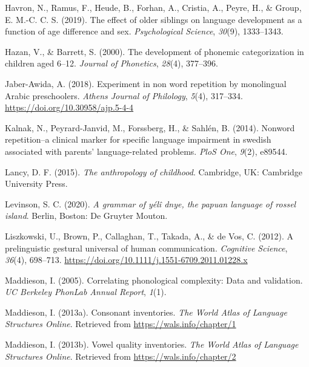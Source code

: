 \documentclass[english,,man,floatsintext]{apa6}
\begin{document}
\leavevmode\hypertarget{ref-havron2019effect}{}%
Havron, N., Ramus, F., Heude, B., Forhan, A., Cristia, A., Peyre, H., \& Group, E. M.-C. C. S. (2019). The effect of older siblings on language development as a function of age difference and sex. \emph{Psychological Science}, \emph{30}(9), 1333--1343.

\leavevmode\hypertarget{ref-hazan2000development}{}%
Hazan, V., \& Barrett, S. (2000). The development of phonemic categorization in children aged 6--12. \emph{Journal of Phonetics}, \emph{28}(4), 377--396.

\leavevmode\hypertarget{ref-jabere2018xperiment}{}%
Jaber-Awida, A. (2018). Experiment in non word repetition by monolingual Arabic preschoolers. \emph{Athens Journal of Philology}, \emph{5}(4), 317--334. \url{https://doi.org/10.30958/ajp.5-4-4}

\leavevmode\hypertarget{ref-kalnak2014nonword}{}%
Kalnak, N., Peyrard-Janvid, M., Forssberg, H., \& Sahlén, B. (2014). Nonword repetition--a clinical marker for specific language impairment in swedish associated with parents' language-related problems. \emph{PloS One}, \emph{9}(2), e89544.

\leavevmode\hypertarget{ref-lancy2015anthropology}{}%
Lancy, D. F. (2015). \emph{The anthropology of childhood}. Cambridge, UK: Cambridge University Press.

\leavevmode\hypertarget{ref-levinsonYDgrammar}{}%
Levinson, S. C. (2020). \emph{A grammar of yélî dnye, the papuan language of rossel island}. Berlin, Boston: De Gruyter Mouton.

\leavevmode\hypertarget{ref-liszkowski2012prelinguistic}{}%
Liszkowski, U., Brown, P., Callaghan, T., Takada, A., \& de Vos, C. (2012). A prelinguistic gestural universal of human communication. \emph{Cognitive Science}, \emph{36}(4), 698--713. \url{https://doi.org/10.1111/j.1551-6709.2011.01228.x}

\leavevmode\hypertarget{ref-maddieson2005correlating}{}%
Maddieson, I. (2005). Correlating phonological complexity: Data and validation. \emph{UC Berkeley PhonLab Annual Report}, \emph{1}(1).

\leavevmode\hypertarget{ref-maddieson2013consonant}{}%
Maddieson, I. (2013a). Consonant inventories. \emph{The World Atlas of Language Structures Online}. Retrieved from \url{https://wals.info/chapter/1}

\leavevmode\hypertarget{ref-maddieson2013vowel}{}%
Maddieson, I. (2013b). Vowel quality inventories. \emph{The World Atlas of Language Structures Online}. Retrieved from \url{https://wals.info/chapter/2}
\end{document}
